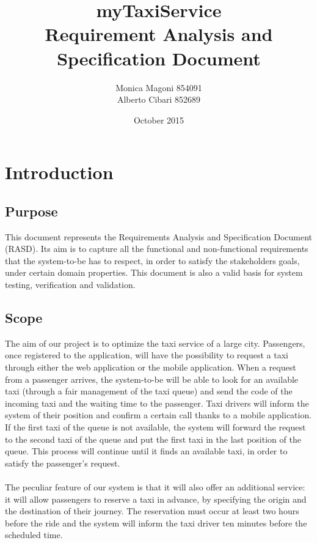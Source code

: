 \documentclass{article}
\title{
	\textbf{\Huge{myTaxiService}}
	\\ 
	\huge{Requirement Analysis and Specification Document}
}
\author{
	Monica Magoni 854091\\Alberto Cibari 852689
}
\date{October 2015}
\begin{document}
	
	\begin{comment}
	Pagina Titolo
	\end{comment}
	\maketitle
	
	
	\begin{comment}
	Pagina Indici
	\end{comment}
	\newpage
	\renewcommand*\contentsname{\Huge{Summary}}
	\tableofcontents
	
	
	\begin{comment}
	Pagine Testo 
	\end{comment}
	\newpage
	\section{Introduction}
	
	\subsection{Purpose}
    	This document represents the Requirements Analysis and Specification Document (RASD).
    	Its aim is to capture all the functional and non-functional requirements that the system-to-be has to respect, in order to satisfy the stakeholders goals, under certain domain properties. This document is also a valid basis for system testing, verification and validation.
	
	\subsection{Scope}
    	The aim of our project is to optimize the taxi service of a large city. 
    	Passengers, once registered to the application, will have the possibility to request a taxi through either the web application or the mobile application. When a request from a passenger arrives, the system-to-be will be able to look for an available taxi (through a fair management of the taxi queue) and send the code of the incoming taxi and the waiting time to the passenger. Taxi drivers will inform the system of their position and confirm a certain call thanks to a mobile application.\\
    	If the first taxi of the queue is not available, the system will forward the request to the second taxi of the queue and put the first taxi in the last position of the queue. This process will continue until it finds an available taxi, in order to satisfy the passenger's request.\\\\
    	The peculiar feature of our system is that it will also offer an additional service: it will allow passengers to reserve a taxi in advance, by specifying the origin and the destination of their journey. The reservation must occur at least two hours before the ride and the system will inform the taxi driver ten minutes before the scheduled time.
	
\end{document}
